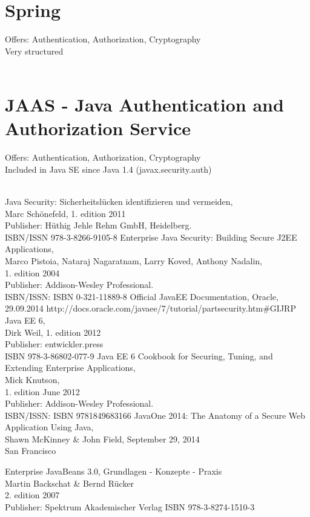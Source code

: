 \documentclass[12pt,a4paper]{report}
\begin{document}
\section{Spring}
Offers: Authentication, Authorization, Cryptography\\
Very structured\\\\

\section{JAAS - Java Authentication and Authorization Service}
Offers: Authentication, Authorization, Cryptography\\
Included in Java SE since Java 1.4 (javax.security.auth)\\\\

\newpage
\begin{thebibliography}{99}
Java Security: Sicherheitslücken identifizieren und vermeiden, \\
Marc Schönefeld, 1. edition 2011\\
Publisher: Hüthig Jehle Rehm GmbH, Heidelberg. \\
ISBN/ISSN 978-3-8266-9105-8
Enterprise Java Security: Building Secure J2EE Applications,\\
Marco Pistoia, Nataraj Nagaratnam, Larry Koved, Anthony Nadalin,\\
1. edition 2004 \\
Publisher: Addison-Wesley Professional.\\
ISBN/ISSN: ISBN 0-321-11889-8
Official JavaEE Documentation, Oracle,\\
29.09.2014
http://docs.oracle.com/javaee/7/tutorial/partsecurity.htm\#GIJRP
Java EE 6,\\
Dirk Weil, 1. edition 2012\\
Publisher: entwickler.press\\
ISBN 978-3-86802-077-9
Java EE 6 Cookbook for Securing, Tuning, and Extending Enterprise Applications,\\
Mick Knutson,\\
1. edition June 2012 \\
Publisher: Addison-Wesley Professional.\\
ISBN/ISSN: ISBN 9781849683166
JavaOne 2014: The Anatomy of a Secure Web Application Using Java, \\
Shawn McKinney \& John Field, September 29, 2014\\
San Francisco

Enterprise JavaBeans 3.0, Grundlagen - Konzepte - Praxis\\
Martin Backschat \& Bernd Rücker\\
2. edition 2007\\
Publisher: Spektrum Akademischer Verlag
ISBN 978-3-8274-1510-3

\newpage
\listoffigures
\end{thebibliography}
\end{document}
